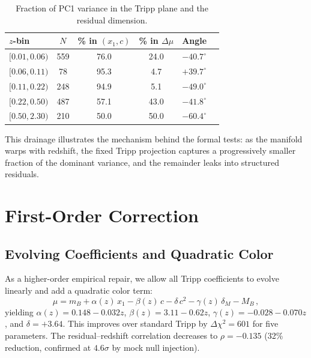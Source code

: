 \documentclass[twocolumn,showpacs,preprintnumbers,amsmath,amssymb,prl]{revtex4-2}
\begin{document}
\begin{table}[h]
\caption{Fraction of PC1 variance in the Tripp plane and the residual dimension.}
\label{tab:pca}
\begin{ruledtabular}
\begin{tabular}{lccccc}
$z$-bin & $N$ & \% in $(x_1,c)$ & \% in $\Delta\mu$ & Angle \\
\hline
$[0.01, 0.06)$ & 559 & 76.0 & 24.0 & $-40.7^\circ$ \\
$[0.06, 0.11)$ & 78  & 95.3 & 4.7  & $+39.7^\circ$ \\
$[0.11, 0.22)$ & 248 & 94.9 & 5.1  & $-49.0^\circ$ \\
$[0.22, 0.50)$ & 487 & 57.1 & 43.0 & $-41.8^\circ$ \\
$[0.50, 2.30)$ & 210 & 50.0 & 50.0 & $-60.4^\circ$ \\
\end{tabular}
\end{ruledtabular}
\end{table}

This drainage illustrates the mechanism behind the formal tests: as the manifold warps with redshift, the fixed Tripp projection captures a progressively smaller fraction of the dominant variance, and the remainder leaks into structured residuals.

\section{First-Order Correction}
\label{sec:correction}

\subsection{Evolving Coefficients and Quadratic Color}

As a higher-order empirical repair, we allow all Tripp coefficients to evolve linearly and add a quadratic color term:
\begin{equation}
\mu = m_B + \alpha(z)\,x_1 - \beta(z)\,c - \delta\,c^2 - \gamma(z)\,\delta_M - M_B\,,
\end{equation}
yielding $\alpha(z) = 0.148 - 0.032z$, $\beta(z) = 3.11 - 0.62z$, $\gamma(z) = -0.028 - 0.070z$, and $\delta = +3.64$. This improves over standard Tripp by $\Delta\chi^2 = 601$ for five parameters. The residual--redshift correlation decreases to $\rho = -0.135$ (32\% reduction, confirmed at $4.6\sigma$ by mock null injection).
\end{document}
